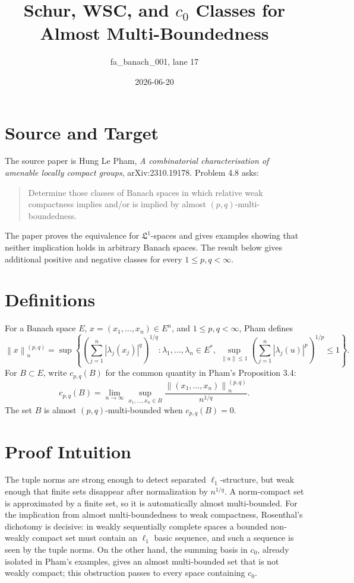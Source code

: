 \documentclass[11pt]{article}
\title{Schur, WSC, and \(c_0\) Classes for Almost Multi-Boundedness}
\author{fa\_banach\_001, lane 17}
\date{2026-06-20}
\newcommand{\norm}[1]{\left\lVert #1 \right\rVert}
\begin{document}
\maketitle

\section*{Source and Target}

The source paper is Hung Le Pham, \emph{A combinatorial characterisation of
amenable locally compact groups}, arXiv:2310.19178.  Problem 4.8 asks:
\begin{quote}
Determine those classes of Banach spaces in which relative weak compactness
implies and/or is implied by almost \((p,q)\)-multi-boundedness.
\end{quote}
The paper proves the equivalence for \(\mathfrak L^1\)-spaces and gives
examples showing that neither implication holds in arbitrary Banach spaces.
The result below gives additional positive and negative classes for every
\(1\le p,q<\infty\).

\section*{Definitions}

For a Banach space \(E\), \(x=(x_1,\ldots,x_n)\in E^n\), and
\(1\le p,q<\infty\), Pham defines
\[
  \norm{x}^{(p,q)}_n =
  \sup\left\{\left(\sum_{j=1}^n |\lambda_j(x_j)|^q\right)^{1/q}:
  \lambda_1,\ldots,\lambda_n\in E^*,\
  \sup_{\norm{u}\le 1}\left(\sum_{j=1}^n|\lambda_j(u)|^p\right)^{1/p}\le 1
  \right\}.
\]
For \(B\subset E\), write \(c_{p,q}(B)\) for the common quantity in Pham's
Proposition 3.4:
\[
  c_{p,q}(B)=
  \lim_{n\to\infty}
  \sup_{x_1,\ldots,x_n\in B}
  \frac{\norm{(x_1,\ldots,x_n)}^{(p,q)}_n}{n^{1/q}}.
\]
The set \(B\) is almost \((p,q)\)-multi-bounded when \(c_{p,q}(B)=0\).

\section*{Proof Intuition}

The tuple norms are strong enough to detect separated \(\ell_1\)-structure,
but weak enough that finite sets disappear after normalization by \(n^{1/q}\).
A norm-compact set is approximated by a finite set, so it is automatically
almost multi-bounded.  For the implication from almost multi-boundedness to
weak compactness, Rosenthal's dichotomy is decisive: in weakly sequentially
complete spaces a bounded non-weakly compact set must contain an \(\ell_1\)
basic sequence, and such a sequence is seen by the tuple norms.  On the other
hand, the summing basis in \(c_0\), already isolated in Pham's examples, gives
an almost multi-bounded set that is not weakly compact; this obstruction passes
to every space containing \(c_0\).
\end{document}
